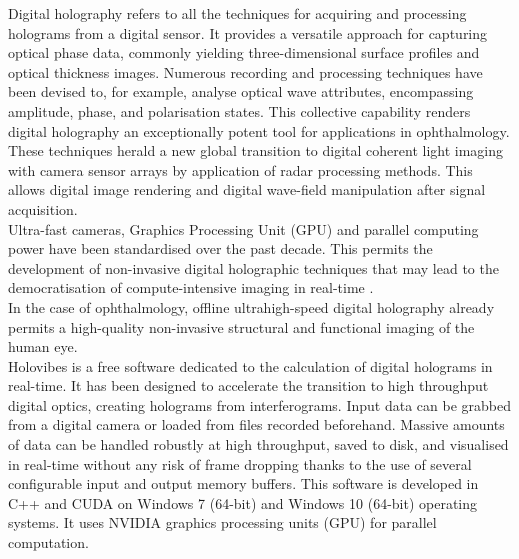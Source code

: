 Digital holography refers to all the techniques for acquiring and processing holograms from a digital sensor. It provides a versatile approach for capturing optical phase data, commonly yielding three-dimensional surface profiles and optical thickness images. Numerous recording and processing techniques have been devised to, for example, analyse optical wave attributes, encompassing amplitude, phase, and polarisation states. This collective capability renders digital holography an exceptionally potent tool for applications in ophthalmology. \\

These techniques herald a new global transition to digital coherent light imaging with camera sensor arrays by application of radar processing methods. This allows digital image rendering \cite{shimobaba2012computational} and digital wave-field manipulation \cite{kumar2013subaperture, javidi2021roadmap} after signal acquisition. \\

Ultra-fast cameras, Graphics Processing Unit (GPU) and parallel computing power have  been standardised over the past decade. This permits the development of non-invasive digital holographic techniques that may lead to the democratisation of compute-intensive imaging in real-time \cite{Leutenegger2011Real, samson2011video, Bencteux2015Holographic, Puyo2020Realtime}.\\

In the case of ophthalmology, offline ultrahigh-speed digital holography already permits a high-quality non-invasive structural and functional imaging \cite{ Hillmann2016, Puyo2018Vivo, tomczewski2022light} of the human eye.\\

Holovibes is a free software dedicated to the calculation of digital holograms in real-time. It has been designed to accelerate the transition to high throughput digital optics, creating holograms from interferograms. Input data can be grabbed from a digital camera or loaded from files recorded beforehand. Massive amounts of data can be handled robustly at high throughput, saved to disk, and visualised in real-time without any risk of frame dropping thanks to the use of several configurable input and output memory buffers. This software is developed in C++ and CUDA on Windows 7 (64-bit) and Windows 10 (64-bit) operating systems. It uses NVIDIA graphics processing units (GPU) for parallel computation.

